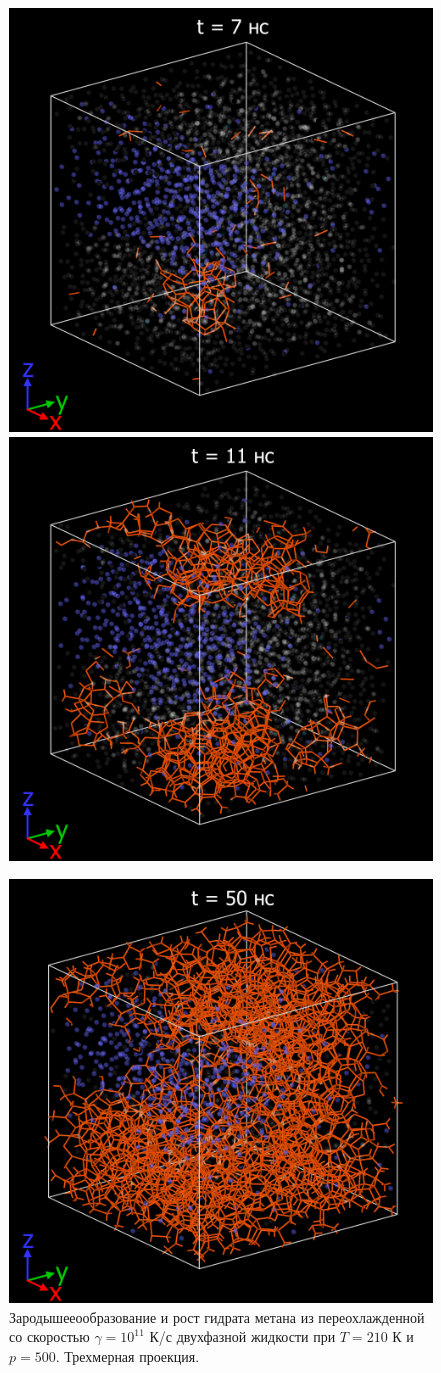 \begin{figure}[H]
    \centering
    \begin{minipage}{\linewidth}
        \includegraphics[width=.49\linewidth]{figures/nuclei7.png}
        \includegraphics[width=.49\linewidth]{figures/nuclei8.png}
    \end{minipage}
    \begin{minipage}{\linewidth}
        \centering
        \includegraphics[width=.5\linewidth]{figures/nuclei9.png}
    \end{minipage}
    \caption{Зародышееообразование и рост гидрата метана из переохлажденной со скоростью $\gamma=10^{11}$ К/с двухфазной жидкости при $T=210$ К и $p=500$. Трехмерная проекция.}
    \label{fig3.6}
\end{figure}

